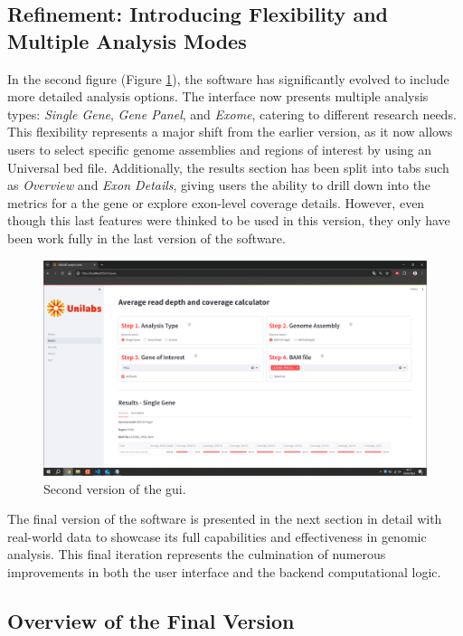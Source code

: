 \subsection{Refinement: Introducing Flexibility and Multiple Analysis Modes}

In the second figure (Figure \ref{fig:v2}), the software has significantly evolved to include more detailed analysis options. The interface now presents multiple analysis types: \textit{Single Gene}, \textit{Gene Panel}, and \textit{Exome}, catering to different research needs. This flexibility represents a major shift from the earlier version, as it now allows users to select specific genome assemblies and regions of interest by using an Universal \ac{bed} file. Additionally, the results section has been split into tabs such as \textit{Overview} and \textit{Exon Details}, giving users the ability to drill down into the metrics for a the gene or explore exon-level coverage details. However, even though this last features were thinked to be used in this version, they only have been work fully in the last version of the software.

\begin{figure}[H]
    \centering
    \includegraphics[width=1\textwidth]{figs/v2.png}
    \caption{Second version of the \ac{gui}.} 
    \label{fig:v2}
\end{figure}


The final version of the software is presented in the next section in detail with real-world data to showcase its full capabilities and effectiveness in genomic analysis. This final iteration represents the culmination of numerous improvements in both the user interface and the backend computational logic.

\subsection{Overview of the Final Version}

